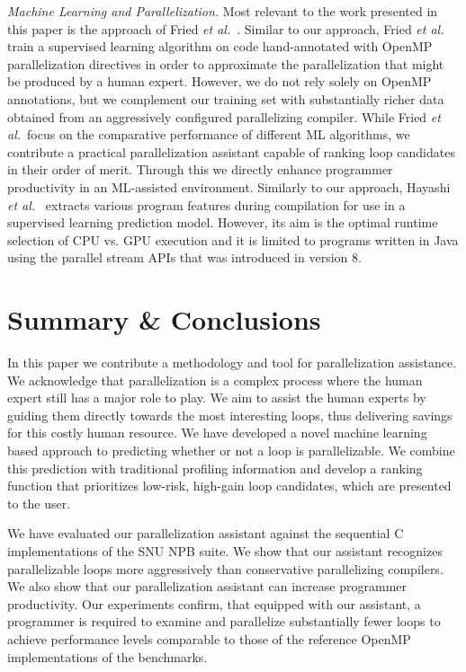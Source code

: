 \textit{Machine Learning and Parallelization.}
Most relevant to the work presented in this paper is the approach of Fried \emph{et al.}~\cite{fried_ea:2013:icmla}. Similar to our approach, Fried \emph{et al.} train a supervised learning algorithm on code hand-annotated with OpenMP parallelization directives in order to approximate the parallelization that might be produced by a human expert. However, we do not rely solely on OpenMP annotations, but we complement our training set with substantially richer data obtained from an aggressively configured parallelizing compiler. While Fried \emph{et al.}~focus on the comparative performance of different ML algorithms, we contribute a practical parallelization assistant capable of ranking loop candidates in their order of merit. Through this we directly enhance programmer productivity in an ML-assisted environment. Similarly to our approach, Hayashi \emph{et al.}~\cite{Hayashi:2015:MPH:2807426.2807429} extracts various program features during compilation for use in a supervised learning prediction model. However, its aim is the optimal runtime selection of CPU vs. GPU execution and it is limited to programs written in Java using the parallel stream APIs that was introduced in version 8.

\section{Summary \& Conclusions}

In this paper we contribute a methodology and tool for parallelization assistance. We acknowledge that parallelization is a complex process where the human expert still has a major role to play. We aim to assist the human experts by guiding them directly towards the most interesting loops, thus delivering savings for this costly human resource. We have developed a novel machine learning based approach to predicting whether or not a loop is parallelizable. We combine this prediction with traditional profiling information and develop a ranking function that prioritizes low-risk, high-gain loop candidates, which are presented to the user.

We have evaluated our parallelization assistant against the sequential C implementations of the SNU NPB suite. We show that our assistant recognizes parallelizable loops more aggressively than conservative parallelizing compilers. We also show that our parallelization assistant can increase programmer productivity. Our experiments confirm, that equipped with our assistant, a programmer is required to examine and parallelize substantially fewer loops to achieve performance levels comparable to those of the reference OpenMP implementations of the benchmarks.

